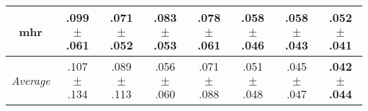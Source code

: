 \begin{tabular}{|c|ccccccc|}
mhr & .099$^{\phantom{\dag}}\pm^{\phantom{\dag}}$.061\cellcolor{red!40} & .071$^{\phantom{\dag}}\pm^{\phantom{\dag}}$.052\cellcolor{green!7} & .083$^{\phantom{\dag}}\pm^{\phantom{\dag}}$.053\cellcolor{red!13} & .078$^{\phantom{\dag}}\pm^{\phantom{\dag}}$.061\cellcolor{red!3} & .058$^{\phantom{\dag}}\pm^{\phantom{\dag}}$.046\cellcolor{green!30} & .058$^{\phantom{\dag}}\pm^{\phantom{\dag}}$.043\cellcolor{green!30} & \textbf{.052$^{\phantom{\dag}}\pm^{\phantom{\dag}}$.041}\cellcolor{green!40} \\\hline
\textit{Average} & .107$^{\phantom{\dag}}\pm^{\phantom{\dag}}$.134\cellcolor{red!40} & .089$^{\phantom{\dag}}\pm^{\phantom{\dag}}$.113\cellcolor{red!18} & .056$^{\phantom{\dag}}\pm^{\phantom{\dag}}$.060\cellcolor{green!23} & .071$^{\phantom{\dag}}\pm^{\phantom{\dag}}$.088\cellcolor{green!4} & .051$^{\phantom{\dag}}\pm^{\phantom{\dag}}$.048\cellcolor{green!28} & .045$^{\phantom{\dag}}\pm^{\phantom{\dag}}$.047\cellcolor{green!37} & \textbf{.042$^{\phantom{\dag}}\pm^{\phantom{\dag}}$.044}\cellcolor{green!40} \\\hline
\end{tabular}